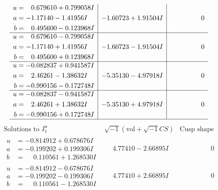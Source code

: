 \documentclass[1p]{elsarticle_modified}
\theoremstyle{definition}
\newcommand{\I}{\sqrt{-1}}
\begin{document}
$$\begin{array}{c|c|c}
\begin{aligned}
u &= \phantom{-}0.679610 + 0.799058 I \\
a &= -1.17140 - 1.41956 I \\
b &= \phantom{-}0.495600 - 0.123968 I\end{aligned}
 & -1.60723 + 1.91504 I & \phantom{-0.000000 } 0 \\ \hline\begin{aligned}
u &= \phantom{-}0.679610 - 0.799058 I \\
a &= -1.17140 + 1.41956 I \\
b &= \phantom{-}0.495600 + 0.123968 I\end{aligned}
 & -1.60723 - 1.91504 I & \phantom{-0.000000 } 0 \\ \hline\begin{aligned}
u &= -0.082837 + 0.941587 I \\
a &= \phantom{-}2.46261 - 1.38632 I \\
b &= -0.990156 - 0.172748 I\end{aligned}
 & -5.35130 - 4.97918 I & \phantom{-0.000000 } 0 \\ \hline\begin{aligned}
u &= -0.082837 - 0.941587 I \\
a &= \phantom{-}2.46261 + 1.38632 I \\
b &= -0.990156 + 0.172748 I\end{aligned}
 & -5.35130 + 4.97918 I & \phantom{-0.000000 } 0\\
 \hline 
 \end{array}$$\newpage$$\begin{array}{c|c|c}  
\text{Solutions to }I^u_{1}& \I (\text{vol} + \sqrt{-1}CS) & \text{Cusp shape}\\
 \hline 
\begin{aligned}
u &= -0.814912 + 0.678676 I \\
a &= -0.199202 + 0.199306 I \\
b &= \phantom{-}0.110561 + 1.268530 I\end{aligned}
 & \phantom{-}4.77410 - 2.66895 I & \phantom{-0.000000 } 0 \\ \hline\begin{aligned}
u &= -0.814912 - 0.678676 I \\
a &= -0.199202 - 0.199306 I \\
b &= \phantom{-}0.110561 - 1.268530 I\end{aligned}
 & \phantom{-}4.77410 + 2.66895 I & \phantom{-0.000000 } 0 \\ \hline\begin{aligned}

\end{aligned}
\end{array}$$
\end{document}
